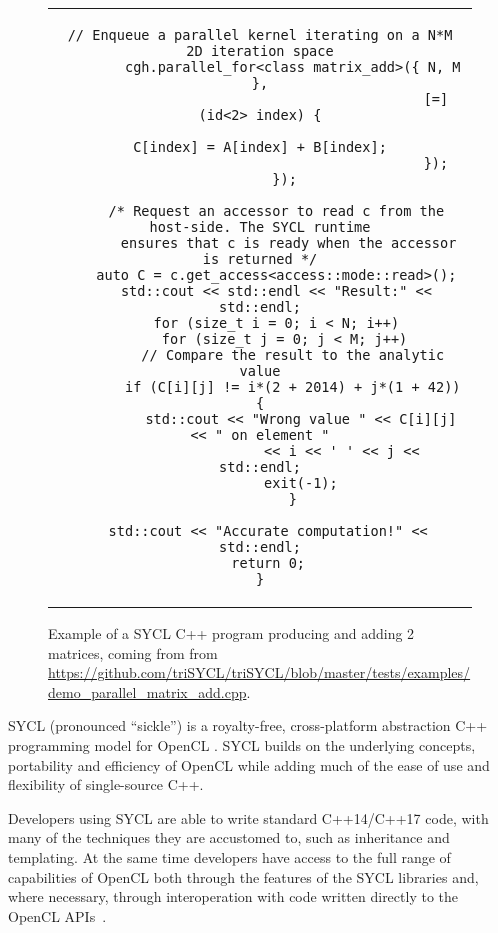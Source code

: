 \documentclass[sigplan]{acmart}
\begin{document}
\begin{figure*}
\begin{tabular}{c}
\begin{lstlisting}[basicstyle=\scriptsize]
        // Enqueue a parallel kernel iterating on a N*M 2D iteration space
        cgh.parallel_for<class matrix_add>({ N, M },
                                           [=] (id<2> index) {
                                             C[index] = A[index] + B[index];
                                           });
      });

    /* Request an accessor to read c from the host-side. The SYCL runtime
       ensures that c is ready when the accessor is returned */
    auto C = c.get_access<access::mode::read>();
    std::cout << std::endl << "Result:" << std::endl;
    for (size_t i = 0; i < N; i++)
      for (size_t j = 0; j < M; j++)
        // Compare the result to the analytic value
        if (C[i][j] != i*(2 + 2014) + j*(1 + 42)) {
          std::cout << "Wrong value " << C[i][j] << " on element "
                    << i << ' ' << j << std::endl;
          exit(-1);
        }

  std::cout << "Accurate computation!" << std::endl;
  return 0;
}
    \end{lstlisting}
  \end{tabular}
  \caption{Example of a SYCL C++ program producing and adding 2
    matrices, coming from from
    \url{https://github.com/triSYCL/triSYCL/blob/master/tests/examples/demo_parallel_matrix_add.cpp}.\label{fig:SYCL-example}}
\end{figure*}

SYCL \cite{SYCL-1.2,SYCL-2.2-provisional} (pronounced ``sickle'') is a
royalty-free, cross-platform abstraction C++ programming model for
OpenCL \cite{OpenCL-API-2.2-provisional,
  OpenCL-C++-2.2-provisional}. SYCL builds on the underlying concepts,
portability and efficiency of OpenCL while adding much of the ease of
use and flexibility of single-source C++.

Developers using SYCL are able to write standard C++14/C++17 code,
with many of the techniques they are accustomed to, such as
inheritance and templating. At the same time developers have access to
the full range of capabilities of OpenCL both through the features of
the SYCL libraries and, where necessary, through interoperation with
code written directly to the OpenCL
APIs~\cite{OpenCL-API-2.2-provisional}.
\end{document}
